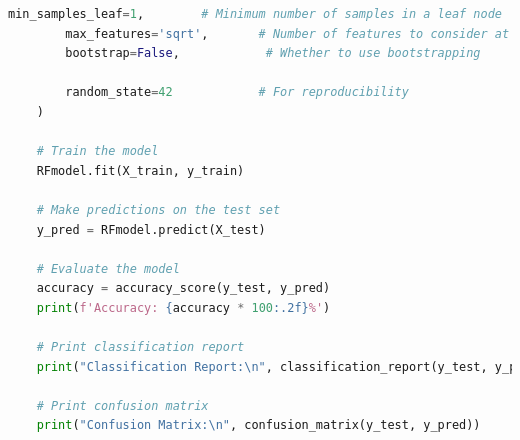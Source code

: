 \begin{tcolorbox}[colback=gray!5!white, colframe=gray!80!black, boxrule=0.5pt, title=Random Forest Classifier Implementation]
    \begin{lstlisting}[language=Python]
        min_samples_leaf=1,        # Minimum number of samples in a leaf node
        max_features='sqrt',       # Number of features to consider at each split
        bootstrap=False,            # Whether to use bootstrapping

        random_state=42            # For reproducibility
    )

    # Train the model
    RFmodel.fit(X_train, y_train)

    # Make predictions on the test set
    y_pred = RFmodel.predict(X_test)

    # Evaluate the model
    accuracy = accuracy_score(y_test, y_pred)
    print(f'Accuracy: {accuracy * 100:.2f}%')

    # Print classification report
    print("Classification Report:\n", classification_report(y_test, y_pred))

    # Print confusion matrix
    print("Confusion Matrix:\n", confusion_matrix(y_test, y_pred))
    \end{lstlisting}
\end{tcolorbox}


